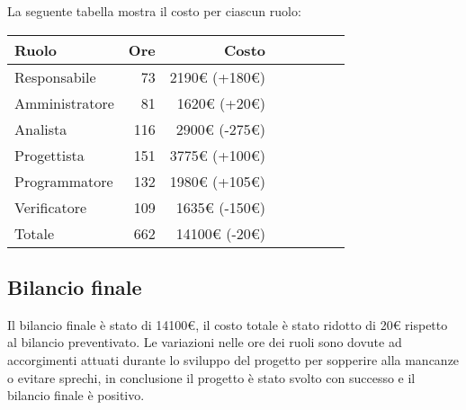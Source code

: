 La seguente tabella mostra il costo per ciascun ruolo:
\begin{table}[H]
    \begin{tabularx}{\linewidth}{X|rrrrrrr}
    \rowcolor{gray!30}Ruolo & Ore & Costo \\
    \hline
    Responsabile                            & 73     & 2190€ (+180€)\\
    \rowcolor{gray!10}Amministratore        & 81     & 1620€ (+20€)\\
    Analista                                & 116    & 2900€ (-275€)\\
    \rowcolor{gray!10}Progettista           & 151    & 3775€ (+100€) \\
    Programmatore                           & 132    & 1980€ (+105€) \\
    \rowcolor{gray!10}Verificatore          & 109    & 1635€ (-150€)\\
    \hline Totale                           & 662    & 14100€ (-20€) \\ 
    \end{tabularx}
\end{table}


\subsection{Bilancio finale}

Il bilancio finale è stato di 14100€, il costo totale è stato ridotto di 20€ rispetto al bilancio preventivato. Le variazioni nelle ore dei ruoli sono dovute ad accorgimenti attuati durante lo sviluppo del progetto per sopperire alla mancanze o evitare sprechi, in conclusione il progetto è stato svolto con successo e il bilancio finale è positivo.